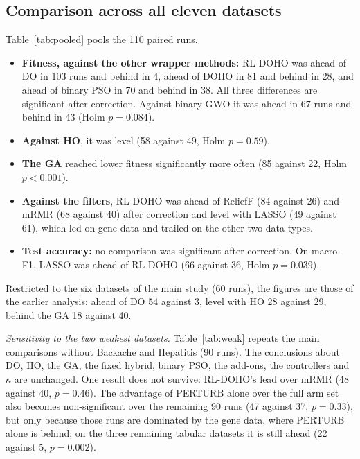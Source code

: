 \documentclass[pdflatex,sn-basic]{sn-jnl}
\begin{document}
\subsection{Comparison across all eleven datasets}\label{sec:pooled}
Table~\ref{tab:pooled} pools the 110 paired runs.
\begin{itemize}
\item \textbf{Fitness, against the other wrapper methods:} RL-DOHO was ahead of DO in 103 runs and behind in 4, ahead of DOHO in 81 and behind in 28, and ahead of binary PSO in 70 and behind in 38. All three differences are significant after correction. Against binary GWO it was ahead in 67 runs and behind in 43 (Holm $p=0.084$).
\item \textbf{Against HO}, it was level (58 against 49, Holm $p=0.59$).
\item \textbf{The GA} reached lower fitness significantly more often (85 against 22, Holm $p<0.001$).
\item \textbf{Against the filters}, RL-DOHO was ahead of ReliefF (84 against 26) and mRMR (68 against 40) after correction and level with LASSO (49 against 61), which led on gene data and trailed on the other two data types.
\item \textbf{Test accuracy:} no comparison was significant after correction. On macro-F1, LASSO was ahead of RL-DOHO (66 against 36, Holm $p=0.039$).
\end{itemize}
Restricted to the six datasets of the main study (60 runs), the figures are those of the earlier analysis: ahead of DO 54 against 3, level with HO 28 against 29, behind the GA 18 against 40.

\emph{Sensitivity to the two weakest datasets.} Table~\ref{tab:weak} repeats the main comparisons without Backache and Hepatitis (90 runs). The conclusions about DO, HO, the GA, the fixed hybrid, binary PSO, the add-ons, the controllers and $\kappa$ are unchanged. One result does not survive: RL-DOHO's lead over mRMR (48 against 40, $p=0.46$). The advantage of PERTURB alone over the full arm set also becomes non-significant over the remaining 90 runs (47 against 37, $p=0.33$), but only because those runs are dominated by the gene data, where PERTURB alone is behind; on the three remaining tabular datasets it is still ahead (22 against 5, $p=0.002$).
\end{document}
